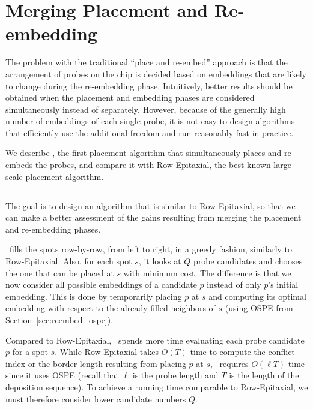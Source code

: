 \chapter{Merging Placement and Re-embedding}
\label{ch:merge}

The problem with the traditional ``place and re-embed'' approach is that the
arrangement of probes on the chip is decided based on embeddings that are
likely to change during the re-embedding phase. Intuitively, better results
should be obtained when the placement and embedding phases are considered
simultaneously instead of separately. However, because of the generally high
number of embeddings of each single probe, it is not easy to design algorithms
that efficiently use the additional freedom and run reasonably fast in
practice.

We describe \Greedyplus , the first placement algorithm that simultaneously
places and re-embeds the probes, and compare it with Row-Epitaxial, the best
known large-scale placement algorithm.

\section{\Greedyplus}
\label{sec:merge_greedyplus}

The goal is to design an algorithm that is similar to Row-Epitaxial, so that we
can make a better assessment of the gains resulting from merging the placement
and re-embedding phases.

\Greedyplus\ fills the spots row-by-row, from left to right, in a
greedy fashion, similarly to Row-Epitaxial. Also, for each spot $s$,
it looks at $Q$ probe candidates and chooses the one that can be
placed at $s$ with minimum cost. The difference is that we now
consider all possible embeddings of a candidate $p$ instead of only
$p$'s initial embedding. This is done by temporarily placing $p$ at
$s$ and computing its optimal embedding with respect to the
already-filled neighbors of $s$ (using OSPE from
Section~\ref{sec:reembed_ospe}).

Compared to Row-Epitaxial, \Greedyplus\ spends more time evaluating each probe
candidate $p$ for a spot $s$. While Row-Epitaxial takes $O(T)$ time to compute
the conflict index or the border length resulting from placing $p$ at $s$,
\Greedyplus\ requires $O(\ell T)$ time since it uses OSPE (recall that $\ell$
is the probe length and $T$ is the length of the deposition sequence). To
achieve a running time comparable to Row-Epitaxial, we must therefore consider
lower candidate numbers $Q$.


